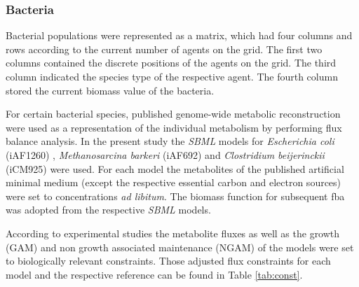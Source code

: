 \subsubsection{Bacteria}
Bacterial populations were represented as a matrix, which had four columns and rows according to the current number of agents on the grid. The first two columns contained the discrete positions of the agents on the grid. The third column indicated the species type of the respective agent. The fourth column stored the current biomass value of the bacteria.

For certain bacterial species, published genome-wide metabolic reconstruction were used as a representation of the individual metabolism by performing flux balance analysis. In the present study the \textit{SBML} models for \emph{Escherichia coli} (iAF1260) \cite{Feist07}, \emph{Methanosarcina barkeri} (iAF692) \cite{Feist06} and \emph{Clostridium beijerinckii} (iCM925) \cite{Milne11} were used. For each model the metabolites of the published artificial minimal medium (except the respective essential carbon and electron sources) were set to concentrations \emph{ad libitum}. The biomass function for subsequent fba was adopted from the respective \textit{SBML} models. 

According to experimental studies the metabolite fluxes as well as the growth (GAM) and non growth associated maintenance (NGAM) of the models were set to biologically relevant constraints. Those adjusted flux constraints for each model and the respective reference can be found in Table \hyperref[ab:const]{\ref{tab:const}}.

